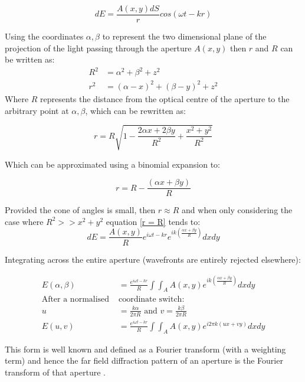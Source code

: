 \begin{equation}
dE = \frac{A(x,y)dS}{r} cos(\omega t -kr)
\end{equation}

Using the coordinates $\alpha,\beta$ to represent the two dimensional plane of the projection of the light passing through the aperture $A(x,y)$ then $r$ and $R$ can be written as:
\begin{align}
R^2 &= \alpha ^2 + \beta ^ 2+ z^2  \\
r^2 &= (\alpha - x)^2 + (\beta - y)^2 + z^2
\end{align}
Where $R$ represents the distance from the optical centre of the aperture to the arbitrary point at $\alpha,\beta$, which can be rewritten as:

\begin{equation}
r = R \sqrt{1 - \frac{2 \alpha x + 2 \beta y}{R^2} + \frac{x^2 + y^2}{R^2}}  \label{r = R}
\end{equation}

Which can be approximated using a binomial expansion to:

\begin{equation}
r = R - \frac{(\alpha x + \beta y)}{R}
\end{equation}

Provided the cone of angles is small, then $r \approx R$ and when only considering the case where $R^2 >> x^2 + y^2$ equation \eqref{r = R} tends to:
\begin{equation}
dE = \frac{A(x,y)}{R} e^{i \omega t - kr} e^{ik \left(\frac{\alpha x + \beta y}{R}\right)} dxdy
\end{equation}

Integrating across the entire aperture (wavefronts are entirely rejected elsewhere):


\begin{align}
E(\alpha,\beta) &= \frac{e^{i \omega t - kr}}{R} \int\int_{A}^{} A(x,y) e^{ik \left(\frac{\alpha x + \beta y}{R}\right)} dxdy
\\  \text{After a normalised } &\text{coordinate switch:} \nonumber \\
u &= \frac{k \alpha}{2 \pi R}  \text{ and }   v = \frac{k \beta}{2 \pi R}
\\ E(u,v)&=\frac{e^{i \omega t - kr}}{R} \int\int_{A}^{} A(x,y) e^{i2 \pi k \left(ux + vy\right)} dxdy
\end{align}

This form is well known and defined as a Fourier transform (with a weighting term) and hence the far field diffraction pattern of an aperture is the Fourier transform of that aperture \cite{Goodman2005}.

